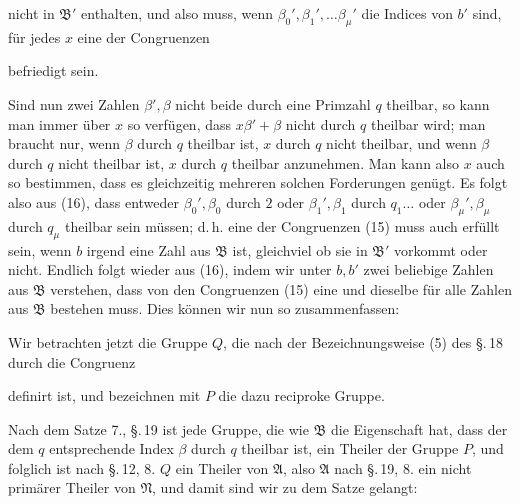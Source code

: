 
nicht in $\mathfrak{B}'$ enthalten, und also muss, wenn $\beta_0', \beta_1', \dots \beta_\mu'$ die
Indices von $b'$ sind, für jedes $x$ eine der Congruenzen


befriedigt sein.

Sind nun zwei Zahlen $\beta', \beta$ nicht beide durch eine Primzahl $q$ theilbar, so kann man immer über $x$ so verfügen, dass $x\beta' + \beta$ nicht durch $q$ theilbar wird; man braucht nur, wenn $\beta$ durch $q$ theilbar ist, $x$ durch $q$ nicht theilbar, und wenn $\beta$ durch $q$ nicht theilbar ist, $x$ durch $q$ theilbar anzunehmen. Man kann also $x$ auch so bestimmen, dass es gleichzeitig mehreren solchen Forderungen genügt. Es folgt also aus (16), dass entweder $\beta_0', \beta_0$ durch $2$ oder $\beta_1', \beta_1$ durch $q_1 \dots$ oder $\beta_\mu', \beta_\mu$ durch $q_\mu$ theilbar sein müssen; d.\,h. eine der Congruenzen (15) muss auch erfüllt sein, wenn $b$ irgend eine Zahl aus $\mathfrak{B}$ ist, gleichviel ob sie in $\mathfrak{B}'$ vorkommt oder nicht. Endlich folgt wieder aus (16), indem wir unter $b, b'$ zwei beliebige Zahlen aus $\mathfrak{B}$ verstehen, dass von den Congruenzen (15) eine und dieselbe für alle Zahlen aus $\mathfrak{B}$ bestehen muss. Dies können wir nun so zusammenfassen:


Wir betrachten jetzt die Gruppe $Q$, die nach der Bezeichnungsweise (5) des \S.\,18 durch die Congruenz


definirt ist, und bezeichnen mit $P$ die dazu reciproke Gruppe.

Nach dem Satze 7., \S.\,19 ist jede Gruppe, die wie $\mathfrak{B}$ die Eigenschaft hat, dass der dem $q$ entsprechende Index $\beta$ durch $q$ theilbar ist, ein Theiler der Gruppe $P$, und folglich ist nach \S.\,12, 8. $Q$ ein Theiler von $\mathfrak{A}$, also $\mathfrak{A}$ nach \S.\,19, 8. ein nicht primärer Theiler von $\mathfrak{N}$, und damit sind wir zu dem Satze gelangt:

